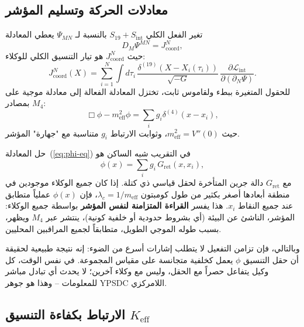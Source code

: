 \documentclass[11pt,a4paper]{article}
\begin{document}
	\subsection{معادلات الحركة وتسليم المؤشر}
	
	تغير الفعل الكلي \(S_{19} + S_{\mathrm{int}}\) بالنسبة لـ \(\Psi_{MN}\) يعطي المعادلة
	\begin{equation}
		D_M \Psi^{MN} = J^{N}_{\mathrm{coord}},
		\label{eq:Psi-eq}
	\end{equation}
	حيث \(J^{N}_{\mathrm{coord}}\) هو تيار التنسيق الكلي للوكلاء:
	\begin{equation}
		J^{N}_{\mathrm{coord}}(X) = \sum_{i=1}^{N} \int d\tau_i\, \frac{\delta^{(19)}(X - X_i(\tau_i))}{\sqrt{-G}}\, \frac{\partial \mathcal{L}_{\mathrm{int}}}{\partial (\partial_N \Psi)}.
	\end{equation}
	للحقول المتغيرة ببطء ولقاموس ثابت، تختزل المعادلة الفعالة إلى معادلة موجية على \(M_4\) بمصادر:
	\begin{equation}
		\Box \phi - m_{\mathrm{eff}}^2 \phi = \sum_{i} g_i \delta^{(4)}(x - x_i),
		\label{eq:phi-eq}
	\end{equation}
	حيث \(m_{\mathrm{eff}}^2 = V''(0)\)، وثوابت الارتباط \(g_i\) متناسبة مع "جهارة" المؤشر.
	
	حل المعادلة~(\ref{eq:phi-eq}) في التقريب شبه الساكن هو
	\begin{equation}
		\phi(x) = \sum_i g_i \, G_{\mathrm{ret}}(x, x_i),
	\end{equation}
	مع \(G_{\mathrm{ret}}\) دالة جرين المتأخرة لحقل قياسي ذي كتلة. إذا كان جميع الوكلاء موجودين في منطقة أبعادها أصغر بكثير من طول كومبتون \(\lambda_c = 1/m_{\mathrm{eff}}\)، فإن \(\phi(x)\) عملياً متطابق عند جميع النقاط \(x_i\). هذا يفسر \textbf{القراءة المتزامنة لنفس المؤشر} بواسطة جميع الوكلاء: المؤشر، الناشئ عن البيئة (أي بشروط حدودية أو خلفية كونية)، ينتشر عبر \(M_4\) ويظهر، بسبب طوله الموجي الطويل، متطابقاً لجميع المراقبين المحليين.
	
	وبالتالي، فإن تزامن التفعيل لا يتطلب إشارات أسرع من الضوء: إنه نتيجة طبيعية لحقيقة أن حقل التنسيق \(\phi\) يعمل كخلفية متجانسة على مقياس المجموعة. في نفس الوقت، كل وكيل يتفاعل حصراً مع الحقل، وليس مع وكلاء آخرين؛ لا يحدث أي تبادل مباشر للمعلومات – وهذا هو جوهر YPSDC اللامركزي.
	
	\subsection{الارتباط بكفاءة التنسيق \(K_{\mathrm{eff}}\)}
	
\end{document}
